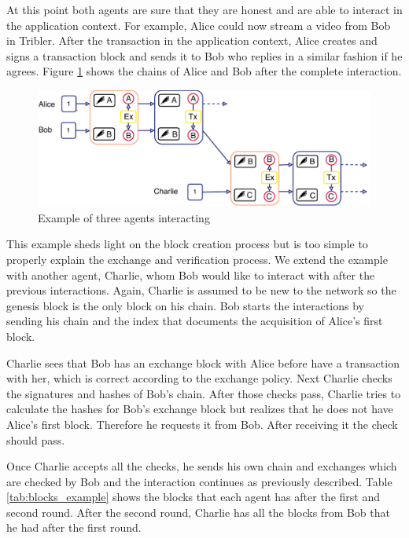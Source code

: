 At this point both agents are sure that they are honest and are able to interact in the 
application context. For example, Alice could now stream a video from Bob in Tribler. After the transaction in 
the application context, Alice creates and signs a transaction block and sends it to Bob who replies 
in a similar fashion if he agrees. Figure \ref{fig:exchange_example} shows the chains of Alice and 
Bob after the complete interaction. 

\begin{figure}
    \centering
    \includegraphics[width=\textwidth]{images/trustchain_example.pdf}
    \caption{Example of three agents interacting}
    \label{fig:exchange_example}
\end{figure}

This example sheds light on the block creation process but is too simple to properly explain the 
exchange and verification process. We extend the example with another agent, Charlie, whom Bob would
like to interact with after the previous interactions. Again, Charlie is assumed to be new to the 
network so the genesis block is the only block on his chain. Bob starts the interactions by sending
his chain and the index that documents the acquisition of Alice's first block. 

Charlie sees that Bob has an exchange block with Alice before have a transaction with her, which is 
correct according to the exchange policy. Next Charlie checks the signatures and hashes of Bob's chain. 
After those checks pass, Charlie tries to calculate the hashes for Bob's exchange block but realizes
that he does not have Alice's first block. Therefore he requests it from Bob. After receiving it the
check should pass. 

Once Charlie accepts all the checks, he sends his own chain and exchanges which are checked by Bob
and the interaction continues as previously described. Table \ref{tab:blocks_example} shows the
blocks that each agent has after the first and second round. After the second round, Charlie has 
all the blocks from Bob that he had after the first round.

